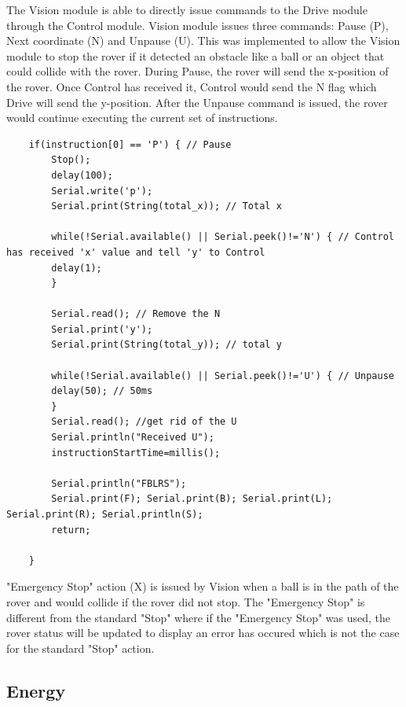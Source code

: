 \documentclass[11pt, a4paper]{article}
\begin{document}
The Vision module is able to directly issue commands to the Drive module through the Control module. Vision module issues three commands: Pause (P), Next coordinate (N) and Unpause (U). This was implemented to allow the Vision module to stop the rover if it detected an obstacle like a ball or an object that could collide with the rover. During Pause, the rover will send the x-position of the rover. Once Control has received it, Control would send the N flag which Drive will send the y-position. After the Unpause command is issued, the rover would continue executing the current set of instructions.

\begin{lstlisting}
    if(instruction[0] == 'P') { // Pause
        Stop();
        delay(100);
        Serial.write('p');
        Serial.print(String(total_x)); // Total x
    
        while(!Serial.available() || Serial.peek()!='N') { // Control has received 'x' value and tell 'y' to Control
        delay(1);
        }
    
        Serial.read(); // Remove the N
        Serial.print('y');
        Serial.print(String(total_y)); // total y
    
        while(!Serial.available() || Serial.peek()!='U') { // Unpause
        delay(50); // 50ms
        }
        Serial.read(); //get rid of the U
        Serial.println("Received U");
        instructionStartTime=millis();
    
        Serial.println("FBLRS");
        Serial.print(F); Serial.print(B); Serial.print(L); Serial.print(R); Serial.println(S);
        return;
    
    }
\end{lstlisting}
    
"Emergency Stop" action (X) is issued by Vision when a ball is in the path of the rover and would collide if the rover did not stop. The "Emergency Stop" is different from the standard "Stop" where if the "Emergency Stop" was used, the rover status will be updated to display an error has occured which is not the case for the standard "Stop" action. 


\pagebreak
\subsection{Energy}
\end{document}

